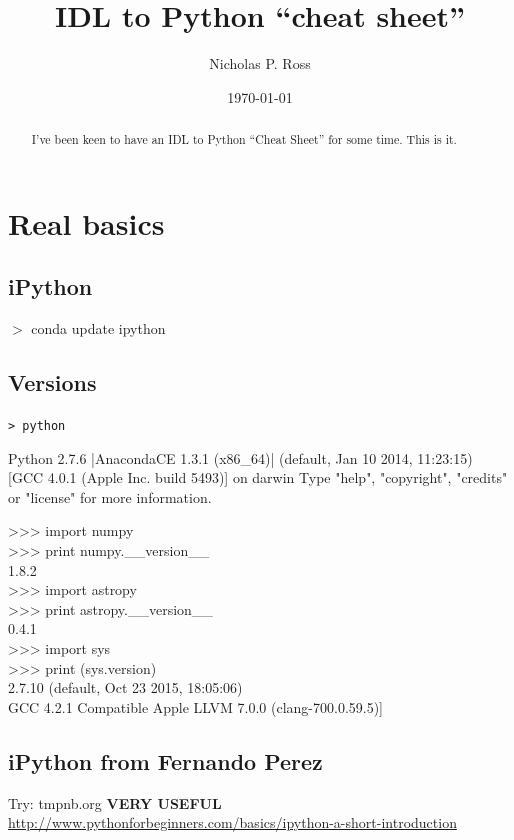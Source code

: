 \documentclass[11pt,a4paper]{article}
\begin{document}
\title{IDL to Python ``cheat sheet''}
\author{Nicholas P. Ross}
\date{\today}
\maketitle



\begin{abstract}
I've been keen to have an IDL to Python ``Cheat Sheet'' for some time. 
This is it. 
\end{abstract}

\section{Real basics}
    \subsection{iPython}
     $>$ conda update ipython

    \subsection{Versions}
    {\tt > python
      
      Python 2.7.6 |AnacondaCE 1.3.1 (x86\_64)| (default, Jan 10 2014, 11:23:15) 
      [GCC 4.0.1 (Apple Inc. build 5493)] on darwin 
      Type "help", "copyright", "credits" or "license" for more information. 
      
      \noindent
      >>> import numpy \\
      >>> print numpy.\_\_version\_\_ \\

      1.8.2 \\
      \noindent
      >>> import astropy \\
      >>> print astropy.\_\_version\_\_ \\

      0.4.1 \\
      \noindent
     >>> import sys\\ 
     >>> print (sys.version) \\

     2.7.10 (default, Oct 23 2015, 18:05:06) \\
     \lbrack GCC 4.2.1 Compatible Apple LLVM 7.0.0 (clang-700.0.59.5)]
     }

    \subsection{iPython from Fernando Perez}
    Try: tmpnb.org  {\bf VERY USEFUL}\\
    \href{http://www.pythonforbeginners.com/basics/ipython-a-short-introduction}{http://www.pythonforbeginners.com/basics/ipython-a-short-introduction}
\end{document}
